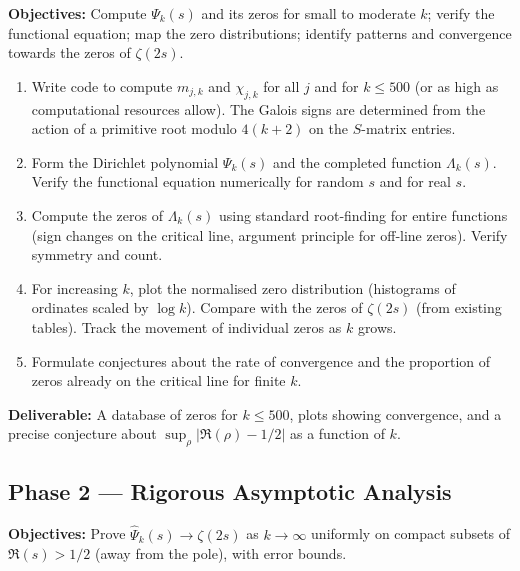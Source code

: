 \documentclass[11pt,a4paper]{article}
\theoremstyle{remark}
\begin{document}
\textbf{Objectives:} Compute \(\Psi_k(s)\) and its zeros for small to moderate \(k\); verify the functional equation; map the zero distributions; identify patterns and convergence towards the zeros of \(\zeta(2s)\).

\begin{enumerate}
\item Write code to compute \(m_{j,k}\) and \(\chi_{j,k}\) for all \(j\) and for \(k\le 500\) (or as high as computational resources allow).
  The Galois signs are determined from the action of a primitive root modulo \(4(k+2)\) on the \(S\)-matrix entries.
\item Form the Dirichlet polynomial \(\Psi_k(s)\) and the completed function \(\Lambda_k(s)\).
  Verify the functional equation numerically for random \(s\) and for real \(s\).
\item Compute the zeros of \(\Lambda_k(s)\) using standard root‑finding for entire functions (sign changes on the critical line, argument principle for off‑line zeros).
  Verify symmetry and count.
\item For increasing \(k\), plot the normalised zero distribution (histograms of ordinates scaled by \(\log k\)).
  Compare with the zeros of \(\zeta(2s)\) (from existing tables).
  Track the movement of individual zeros as \(k\) grows.
\item Formulate conjectures about the rate of convergence and the proportion of zeros already on the critical line for finite \(k\).
\end{enumerate}

\textbf{Deliverable:} A database of zeros for \(k\le 500\), plots showing convergence, and a precise conjecture about \(\sup_{\rho}|\Re(\rho)-1/2|\) as a function of \(k\).

\subsection{Phase 2 --- Rigorous Asymptotic Analysis}

\textbf{Objectives:} Prove \(\widehat{\Psi}_k(s)\to\zeta(2s)\) as \(k\to\infty\) uniformly on compact subsets of \(\Re(s)>1/2\) (away from the pole), with error bounds.
\end{document}
